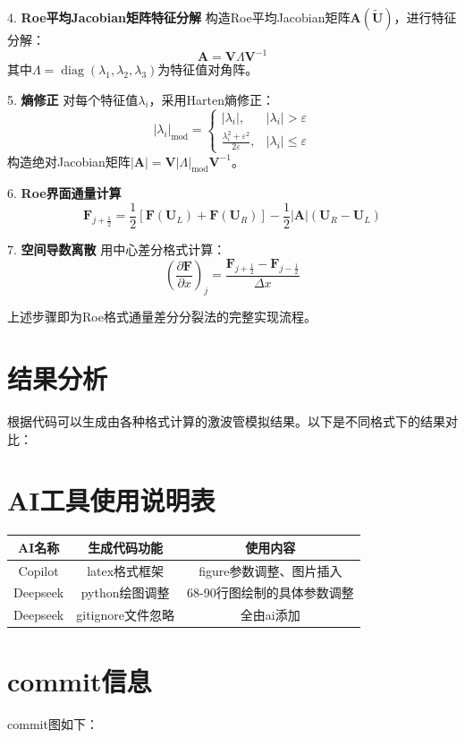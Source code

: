 \documentclass[12pt,a4paper]{article}
\begin{document}
4. \textbf{Roe平均Jacobian矩阵特征分解}  
    构造Roe平均Jacobian矩阵$\mathbf{A}(\tilde{\mathbf{U}})$，进行特征分解：
    \[
    \mathbf{A} = \mathbf{V} \Lambda \mathbf{V}^{-1}
    \]
    其中$\Lambda = \operatorname{diag}(\lambda_1, \lambda_2, \lambda_3)$为特征值对角阵。

5. \textbf{熵修正}  
    对每个特征值$\lambda_i$，采用Harten熵修正：
    \[
    |\lambda_i|_{\text{mod}} = 
    \begin{cases}
    |\lambda_i|, & |\lambda_i| > \varepsilon \\
    \frac{\lambda_i^2 + \varepsilon^2}{2\varepsilon}, & |\lambda_i| \leq \varepsilon
    \end{cases}
    \]
    构造绝对Jacobian矩阵$|\mathbf{A}| = \mathbf{V} |\Lambda|_{\text{mod}} \mathbf{V}^{-1}$。

6. \textbf{Roe界面通量计算}  
    \[
    \mathbf{F}_{j+\frac{1}{2}} = \frac{1}{2} \left[ \mathbf{F}(\mathbf{U}_L) + \mathbf{F}(\mathbf{U}_R) \right] - \frac{1}{2} |\mathbf{A}| (\mathbf{U}_R - \mathbf{U}_L)
    \]

7. \textbf{空间导数离散}  
    用中心差分格式计算：
    \[
    \left( \frac{\partial \mathbf{F}}{\partial x} \right)_j = \frac{\mathbf{F}_{j+\frac{1}{2}} - \mathbf{F}_{j-\frac{1}{2}}}{\Delta x}
    \]

上述步骤即为Roe格式通量差分分裂法的完整实现流程。


\newpage   
\section{结果分析}
根据代码可以生成由各种格式计算的激波管模拟结果。以下是不同格式下的结果对比：


\section{AI工具使用说明表}
\begin{table}[!htbp]
    \centering
    \begin{tabular}{|c|c|c|}
        \hline
        \textbf{AI名称} & \textbf{生成代码功能} & \textbf{使用内容} \\
        \hline
        Copilot & latex格式框架 & figure参数调整、图片插入\\
        \hline
        Deepseek & python绘图调整 & 68-90行图绘制的具体参数调整\\
        \hline
        Deepseek & gitignore文件忽略 & 全由ai添加\\
        \hline
\end{tabular}
\end{table}
\section{commit信息}
commit图如下：
\end{document}
